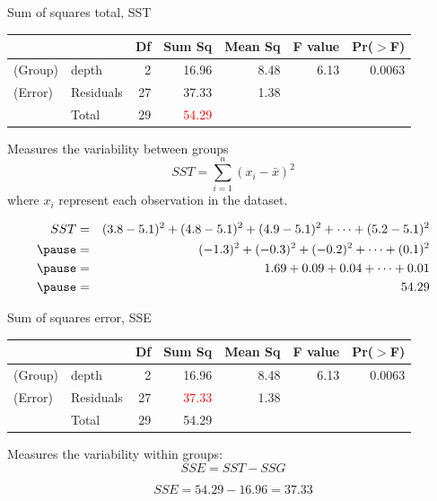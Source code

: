 \documentclass[
  ignorenonframetext,
]{beamer}
\begin{document}
\begin{frame}{Sum of squares total, SST}
\protect\hypertarget{sum-of-squares-total-sst}{}
\begin{center}
\begin{tabular}{ll rrrrr}
\hline
            &           & Df    & Sum Sq    & Mean Sq   & F value   & Pr($>$F) \\ 
\hline
(\alert{G}roup)     & depth         & 2     & 16.96 & 8.48      & 6.13  & 0.0063 \\ 
(\alert{E}rror)     & Residuals     & 27    & 37.33     & 1.38      &       &  \\ 
\hline
            & \alert{T}otal & 29    & \textcolor{red}{54.29} \\
\end{tabular}
\end{center}

Measures the variability between groups \vspace{-0.25cm}
\[ SST = \sum_{i = 1}^{n} (x_i - \bar{x})^2 \] where \(x_i\) represent
each observation in the dataset.

\pause

\vspace{-0.75cm}

\begin{eqnarray*}
SST &=& (3.8 - 5.1)^2 + (4.8 - 5.1)^2 + (4.9 - 5.1)^2 + \cdots + (5.2 - 5.1)^2 \\
\pause
&=& (-1.3)^2 + (-0.3)^2 + (-0.2)^2 + \cdots + (0.1)^2 \\
\pause
&=& 1.69 + 0.09 + 0.04 + \cdots + 0.01 \\
\pause
&=& 54.29
\end{eqnarray*}
\end{frame}

\begin{frame}{Sum of squares error, SSE}
\protect\hypertarget{sum-of-squares-error-sse}{}
\begin{center}
\begin{tabular}{ll rrrrr}
\hline
            &           & Df    & Sum Sq    & Mean Sq   & F value   & Pr($>$F) \\ 
\hline
(\alert{G}roup)     & depth         & 2     & 16.96 & 8.48      & 6.13  & 0.0063 \\ 
(\alert{E}rror)     & Residuals     & 27    & \textcolor{red}{37.33}    & 1.38      &       &  \\ 
\hline
            & \alert{T}otal & 29    & 54.29 \\
\end{tabular}
\end{center}

Measures the variability within groups: \[ SSE = SST - SSG \]

\pause

\[ SSE =  54.29 - 16.96 =  37.33 \]
\end{frame}
\end{document}
